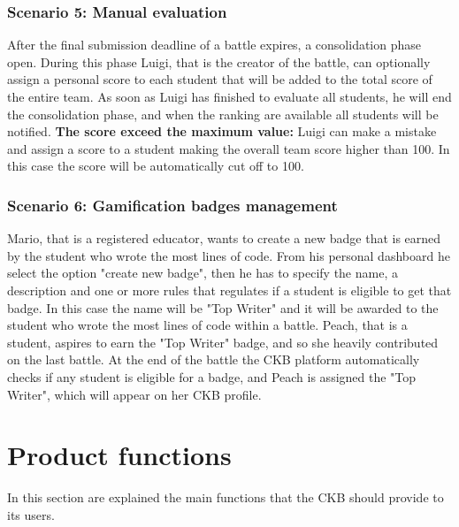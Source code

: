 \subsubsection{Scenario 5: Manual evaluation}
After the final submission deadline of a battle expires, a consolidation phase open. During this phase Luigi, that is the creator of the battle, can optionally assign a personal score to each student that will be added to the total score of the entire team.
As soon as Luigi has finished to evaluate all students, he will end the consolidation phase, and when the ranking are available all students will be notified.\newline
\textbf{The score exceed the maximum value:} Luigi can make a mistake and assign a score to a student making the overall team score higher than 100. In this case the score will be automatically cut off to 100.

\subsubsection{Scenario 6: Gamification badges management}
Mario, that is a registered educator, wants to create a new badge that is earned by the student who wrote the most lines of code. From his personal dashboard he select the option "create new badge", then he has to specify the name, a description and one or more rules that regulates if a student is eligible to get that badge. In this case the name will be "Top Writer" and it will be awarded to the student who wrote the most lines of code within a battle. \newline
Peach, that is a student, aspires to earn the "Top Writer" badge, and so she heavily contributed on the last battle. At the end of the battle the CKB platform automatically checks if any student is eligible for a badge, and Peach is assigned the "Top Writer", which will appear on her CKB profile.


\clearpage

\section{Product functions}\label{desc:prodFunc}
In this section are explained the main functions that the CKB should provide to its users.
